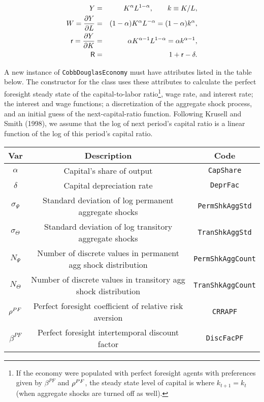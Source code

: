 \documentclass[12pt,titlepage,letterpaper]{econtex}
\begin{document}
\begin{eqnarray*}
Y &=& K^\alpha L^{1-\alpha}, \qquad k \equiv K/L,\\
W = \frac{\partial Y}{\partial L} &=& (1-\alpha) K^{\alpha} L^{-\alpha} = (1-\alpha) k^\alpha, \\
\mathsf{r} = \frac{\partial Y}{\partial K} &=& \alpha K^{\alpha-1} L^{1-\alpha} = \alpha k^{\alpha-1}, \\
\mathsf{R} &=& 1 + \mathsf{r} - \delta.
\end{eqnarray*}

A new instance of \texttt{CobbDouglasEconomy} must have attributes listed in the table below.  The constructor for the class uses these attributes to calculate the perfect foresight steady state of the capital-to-labor ratio\footnote{If the economy were populated with perfect foresight agents with preferences given by $\beta^{PF}$ and $\rho^{PF}$, the steady state level of capital is where $k_{t+1} = k_t$ (when aggregate shocks are turned off as well).}, wage rate, and interest rate; the interest and wage functions; a discretization of the aggregate shock process, and an initial guess of the next-capital-ratio function.  Following Krusell and Smith (1998), we assume that the log of next period's capital ratio is a linear function of the log of this period's capital ratio.

\begin{table}[h!]
\centering
\begin{tabular}{c c c}
Var & Description & Code \\
\hline
$\alpha$ & Capital's share of output & \texttt{CapShare} \\
$\delta$ & Capital depreciation rate & \texttt{DeprFac} \\
$\sigma_\Psi$ & Standard deviation of log permanent aggregate shocks & \texttt{PermShkAggStd} \\
$\sigma_\Theta$ & Standard deviation of log transitory aggregate shocks & \texttt{TranShkAggStd} \\
$N_\Psi$ & Number of discrete values in permanent agg shock distribution & \texttt{PermShkAggCount} \\
$N_\Theta$ & Number of discrete values in transitory agg shock distribution & \texttt{TranShkAggCount} \\
$\rho^{PF}$ & Perfect foresight coefficient of relative risk aversion & \texttt{CRRAPF} \\
$\beta^{PF}$ & Perfect foresight intertemporal discount factor & \texttt{DiscFacPF} \\
\end{tabular}
\end{table}
\end{document}
